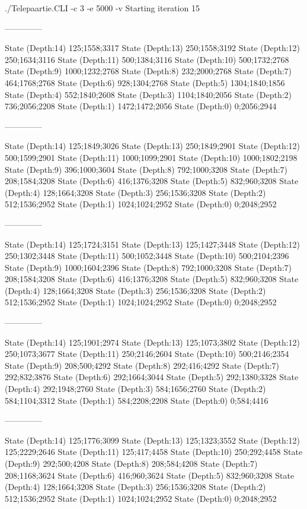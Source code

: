 \documentclass[a4paper,10pt,ngerman]{scrartcl}
\begin{document}
\begin{lstcs}
./Telepaartie.CLI -c 3 -e 5000 -v
Starting iteration 15

--------------

State (Depth:14) {125;1558;3317}
State (Depth:13) {250;1558;3192}
State (Depth:12) {250;1634;3116}
State (Depth:11) {500;1384;3116}
State (Depth:10) {500;1732;2768}
State (Depth:9) {1000;1232;2768}
State (Depth:8) {232;2000;2768}
State (Depth:7) {464;1768;2768}
State (Depth:6) {928;1304;2768}
State (Depth:5) {1304;1840;1856}
State (Depth:4) {552;1840;2608}
State (Depth:3) {1104;1840;2056}
State (Depth:2) {736;2056;2208}
State (Depth:1) {1472;1472;2056}
State (Depth:0) {0;2056;2944}

--------------

State (Depth:14) {125;1849;3026}
State (Depth:13) {250;1849;2901}
State (Depth:12) {500;1599;2901}
State (Depth:11) {1000;1099;2901}
State (Depth:10) {1000;1802;2198}
State (Depth:9) {396;1000;3604}
State (Depth:8) {792;1000;3208}
State (Depth:7) {208;1584;3208}
State (Depth:6) {416;1376;3208}
State (Depth:5) {832;960;3208}
State (Depth:4) {128;1664;3208}
State (Depth:3) {256;1536;3208}
State (Depth:2) {512;1536;2952}
State (Depth:1) {1024;1024;2952}
State (Depth:0) {0;2048;2952}

--------------

State (Depth:14) {125;1724;3151}
State (Depth:13) {125;1427;3448}
State (Depth:12) {250;1302;3448}
State (Depth:11) {500;1052;3448}
State (Depth:10) {500;2104;2396}
State (Depth:9) {1000;1604;2396}
State (Depth:8) {792;1000;3208}
State (Depth:7) {208;1584;3208}
State (Depth:6) {416;1376;3208}
State (Depth:5) {832;960;3208}
State (Depth:4) {128;1664;3208}
State (Depth:3) {256;1536;3208}
State (Depth:2) {512;1536;2952}
State (Depth:1) {1024;1024;2952}
State (Depth:0) {0;2048;2952}

--------------

State (Depth:14) {125;1901;2974}
State (Depth:13) {125;1073;3802}
State (Depth:12) {250;1073;3677}
State (Depth:11) {250;2146;2604}
State (Depth:10) {500;2146;2354}
State (Depth:9) {208;500;4292}
State (Depth:8) {292;416;4292}
State (Depth:7) {292;832;3876}
State (Depth:6) {292;1664;3044}
State (Depth:5) {292;1380;3328}
State (Depth:4) {292;1948;2760}
State (Depth:3) {584;1656;2760}
State (Depth:2) {584;1104;3312}
State (Depth:1) {584;2208;2208}
State (Depth:0) {0;584;4416}

--------------

State (Depth:14) {125;1776;3099}
State (Depth:13) {125;1323;3552}
State (Depth:12) {125;2229;2646}
State (Depth:11) {125;417;4458}
State (Depth:10) {250;292;4458}
State (Depth:9) {292;500;4208}
State (Depth:8) {208;584;4208}
State (Depth:7) {208;1168;3624}
State (Depth:6) {416;960;3624}
State (Depth:5) {832;960;3208}
State (Depth:4) {128;1664;3208}
State (Depth:3) {256;1536;3208}
State (Depth:2) {512;1536;2952}
State (Depth:1) {1024;1024;2952}
State (Depth:0) {0;2048;2952}


\end{lstcs}
\end{document}
